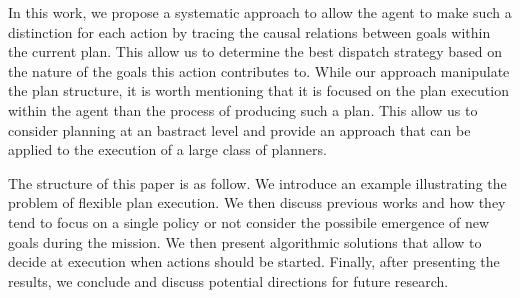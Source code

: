 In this work, we propose a systematic approach to allow the agent to
make such a distinction for each action by tracing the causal
relations between goals within the current plan. This allow us to
determine the best dispatch strategy based on the nature of the goals
this action contributes to. While our approach manipulate the plan
structure, it is worth mentioning that it is focused on the plan
execution within the agent than the process of producing such a
plan. This allow us to consider planning at an bastract level and
provide an approach that can be applied to the execution of a large
class of planners.

The structure of this paper is as follow. We introduce an example
illustrating the problem of flexible plan execution. We then discuss
previous works and how they tend to focus on a single policy or not
consider the possibile emergence of new goals during the mission. We
then present algorithmic solutions that allow to decide at execution
when actions should be started. Finally, after presenting the results,
we conclude and discuss potential directions for future research.






